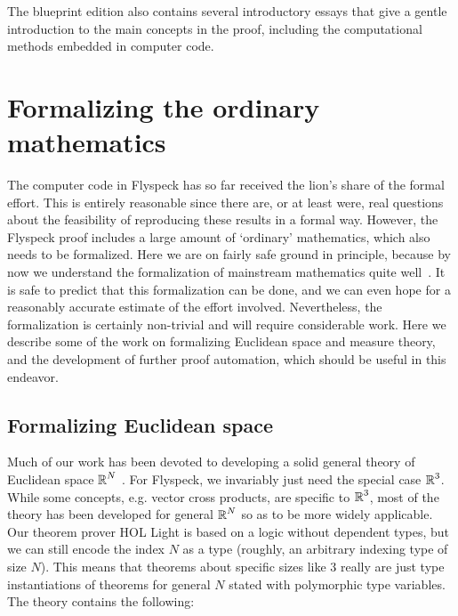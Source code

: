 \documentclass[11pt]{amsart}
\newcommand{\real}{\mbox{$\protect\mathbb R$}}
\begin{document}
The blueprint edition also contains several introductory essays that give a gentle introduction
to the main concepts in the proof, including the computational methods embedded in computer code.




\section{Formalizing the ordinary mathematics}
\label{sec:ordinary}

The computer code in Flyspeck has so far received the lion's share of the
formal effort. This is entirely reasonable since there are, or at least were,
real questions about the feasibility of reproducing these results in a formal
way. However, the Flyspeck proof includes a large amount of `ordinary'
mathematics, which also needs to be formalized. Here we are on fairly safe
ground in principle, because by now we understand the formalization of
mainstream mathematics quite well~\cite{wiedijk-17}. It is safe to predict that
this formalization can be done, and we can even hope for a reasonably accurate
estimate of the effort involved. Nevertheless, the formalization is certainly
non-trivial and will require considerable work. Here we describe some of the
work on formalizing Euclidean space and measure theory, and the development of
further proof automation, which should be useful in this endeavor.

\subsection*{Formalizing Euclidean space}

Much of our work has been devoted to developing a solid general theory of
Euclidean space $\real^N$ \cite{harrison-euclidean}. For Flyspeck, we
invariably just need the special case $\real^3$. While some concepts, e.g.
vector cross products, are specific to $\real^3$, most of the theory has been
developed for general $\real^N$ so as to be more widely applicable. Our theorem
prover HOL Light \cite{harrison-demo} is based on a logic without dependent
types, but we can still encode the index $N$ as a type (roughly, an arbitrary
indexing type of size $N$). This means that theorems about specific sizes like
$3$ really are just type instantiations of theorems for general $N$ stated with
polymorphic type variables. The theory contains the following:
\end{document}
